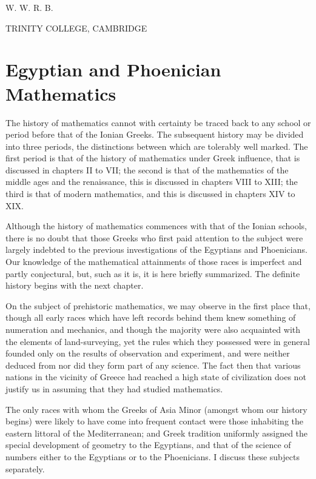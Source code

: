 \documentclass[12pt,oneside]{book}
\begin{document}
\begin{flushright}
    {\Large W. W. R. B.}
\end{flushright}
{\footnotesize TRINITY COLLEGE, CAMBRIDGE}

\tableofcontents

\mainmatter

\chapter{Egyptian and Phoenician Mathematics}

The history of mathematics cannot with certainty be traced back to any school or period before that of the Ionian Greeks.
The subsequent history may be divided into three periods, the distinctions between which are tolerably well marked.
The first period is that of the history of mathematics under Greek influence, that is discussed in chapters II to VII;
the second is that of the mathematics of the middle ages and the renaissance, this is discussed in chapters VIII to XIII;
the third is that of modern mathematics, and this is discussed in chapters XIV to XIX. 

Although the history of mathematics commences with that of the Ionian schools, there is no doubt that those Greeks who first paid attention 
to the subject were largely indebted to the previous investigations of the Egyptians and Phoenicians. Our knowledge of the mathematical
attainments of those races is imperfect and partly conjectural, but, such as it is, it is here briefly summarized. The definite
history begins with the next chapter.

On the subject of prehistoric mathematics, we may observe in the first place that, though all early races which have left records behind them knew something of numeration
and mechanics, and though the majority were also acquainted with the elements of land-surveying, yet the rules which they possessed were in general founded only on the 
results of observation and experiment, and were neither deduced from nor did they form part of any science. The fact then that various nations in the vicinity of Greece had reached
a high state of civilization does not justify us in assuming that they had studied mathematics. \par 

The only races with whom the Greeks of Asia Minor (amongst whom our history begins) were likely to have come into frequent contact were those inhabiting the eastern littoral of
the Mediterranean; and Greek tradition uniformly assigned the special development of geometry to the Egyptians, and that of the science of numbers either to the 
Egyptians or to the Phoenicians. I discuss these subjects separately. \par 
\end{document}

